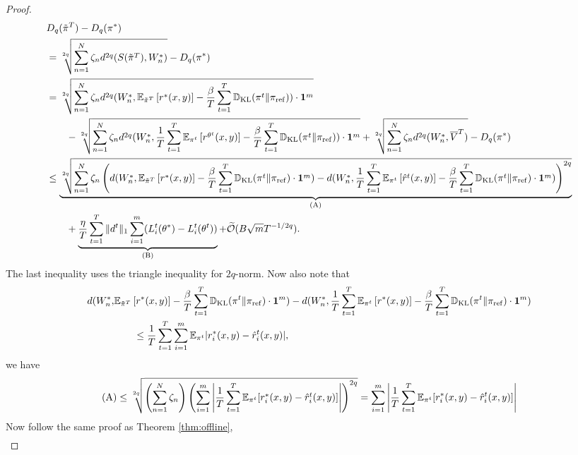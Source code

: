 \begin{proof}
\begin{align}
    &D_q(\tilde{\pi}^T) - D_q(\pi^*)\\
    &=\sqrt[2q]{\sum_{n=1}^N\zeta_n d^{2q}(S(\tilde{\pi}^T), W_n^*)}  - D_q(\pi^*)\nonumber\\
    &=\sqrt[2q]{\sum_{n=1}^N\zeta_n d^{2q}(W_n^*, \mathbb{E}_{\tilde{\pi}^T}\left[r^*(x,y) \right]- \frac{\beta}{T}\sum_{t=1}^T \mathbb{D}_{\mathrm{KL}}(\pi^t\|\pi_{\mathrm{ref}}))\cdot \mathbf{1}^m} \nonumber\\
    &\qquad - \sqrt[2q]{\sum_{n=1}^N\zeta_n d^{2q}(W_n^*, \frac{1}{T}\sum_{t=1}^T \mathbb{E}_{\pi^t}\left[r^{\theta^t}(x,y) \right]- \frac{\beta}{T}\sum_{t=1}^T \mathbb{D}_{\mathrm{KL}}(\pi^t\|\pi_{\mathrm{ref}}))\cdot \mathbf{1}^m}+ \sqrt[2q]{\sum_{n=1}^N\zeta_n d^{2q}(W_n^*, \overline{V}^T)} - D_q(\pi^*)\nonumber\\
    &\le \underbrace{\sqrt[2q]{\sum_{n=1}^N\zeta_n \left(d(W_n^*, \mathbb{E}_{\tilde{\pi}^T}\left[r^*(x,y) \right]- \frac{\beta}{T}\sum_{t=1}^T \mathbb{D}_{\mathrm{KL}}(\pi^t\|\pi_{\mathrm{ref}})\cdot \mathbf{1}^m)-d(W_n^*, \frac{1}{T}\sum_{t=1}^T\mathbb{E}_{\pi^t}\left[\hat{r}^t(x,y) \right]- \frac{\beta}{T}\sum_{t=1}^T \mathbb{D}_{\mathrm{KL}}(\pi^t\|\pi_{\mathrm{ref}})\cdot \mathbf{1}^m)\right)^{2q}}}_{\text{(A)}}\nonumber\\&\qquad + \underbrace{\frac{\eta}{T}\sum_{t=1}^T\|d^t\|_1\sum_{i=1}^m (L_i^t(\theta^*) -L_i^t(\theta^t)) }_{\text{(B)}} + \widetilde{\mathcal{O}}(B\sqrt{m} T^{-1/2q}).\label{final result 2}
\end{align}
The last inequality uses the triangle inequality for $2q$-norm. Now also note that \begin{align*}d(W_n^*, &\mathbb{E}_{\tilde{\pi}^T}\left[r^*(x,y) \right]- \frac{\beta}{T}\sum_{t=1}^T \mathbb{D}_{\mathrm{KL}}(\pi^t\|\pi_{\mathrm{ref}})\cdot \mathbf{1}^m)-d(W_n^*, \frac{1}{T}\sum_{t=1}^T\mathbb{E}_{\pi^t}\left[r^*(x,y) \right]- \frac{\beta}{T}\sum_{t=1}^T \mathbb{D}_{\mathrm{KL}}(\pi^t\|\pi_{\mathrm{ref}})\cdot \mathbf{1}^m) \\&\qquad \le \frac{1}{T}\sum_{t=1}^T\sum_{i=1}^m \mathbb{E}_{\pi^t}|r_i^*(x,y) - \hat{r}_i^t(x,y)|,\end{align*} we have 
\begin{align*}
    \text{(A)}\le \sqrt[2q]{\left(\sum_{n=1}^N \zeta_n\right) \left(\sum_{i=1}^m\Bigg|\frac{1}{T}\sum_{t=1}^T \mathbb{E}_{\pi^t}[r_i^*(x,y) -\hat{r}_i^t(x,y)]\Bigg|\right)^{2q}}  = \sum_{i=1}^m\Bigg|\frac{1}{T}\sum_{t=1}^T \mathbb{E}_{\pi^t}[r_i^*(x,y) -\hat{r}_i^t(x,y)]\Bigg|
\end{align*}
Now follow the same proof as Theorem \ref{thm:offline}, 
\begin{align*}

\end{align*}
\end{proof}
